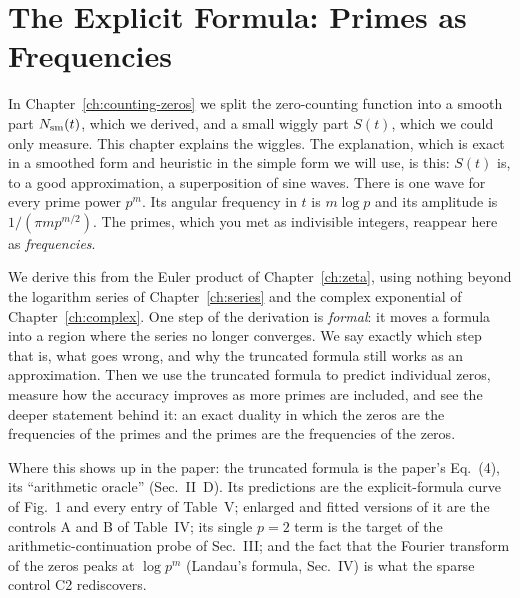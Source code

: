 \chapter{The Explicit Formula: Primes as Frequencies}\label{ch:explicit-formula}

\begin{chapterintro}
In Chapter~\ref{ch:counting-zeros} we split the zero-counting function into a smooth part $N_{\mathrm{sm}}(t)$, which we derived, and a small wiggly part $S(t)$, which we could only measure. This chapter explains the wiggles. The explanation, which is exact in a smoothed form and heuristic in the simple form we will use, is this: $S(t)$ is, to a good approximation, a superposition of sine waves. There is one wave for every prime power $p^m$. Its angular frequency in $t$ is $m\log p$ and its amplitude is $1/(\pi m p^{m/2})$. The primes, which you met as indivisible integers, reappear here as \emph{frequencies}.

We derive this from the Euler product of Chapter~\ref{ch:zeta}, using nothing beyond the logarithm series of Chapter~\ref{ch:series} and the complex exponential of Chapter~\ref{ch:complex}. One step of the derivation is \emph{formal}: it moves a formula into a region where the series no longer converges. We say exactly which step that is, what goes wrong, and why the truncated formula still works as an approximation. Then we use the truncated formula to predict individual zeros, measure how the accuracy improves as more primes are included, and see the deeper statement behind it: an exact duality in which the zeros are the frequencies of the primes and the primes are the frequencies of the zeros.

Where this shows up in the paper: the truncated formula is the paper's Eq.~(4), its ``arithmetic oracle'' (Sec.~II~D). Its predictions are the explicit-formula curve of Fig.~1 and every entry of Table~V; enlarged and fitted versions of it are the controls A and B of Table~IV; its single $p=2$ term is the target of the arithmetic-continuation probe of Sec.~III; and the fact that the Fourier transform of the zeros peaks at $\log p^m$ (Landau's formula, Sec.~IV) is what the sparse control C2 rediscovers.
\end{chapterintro}

